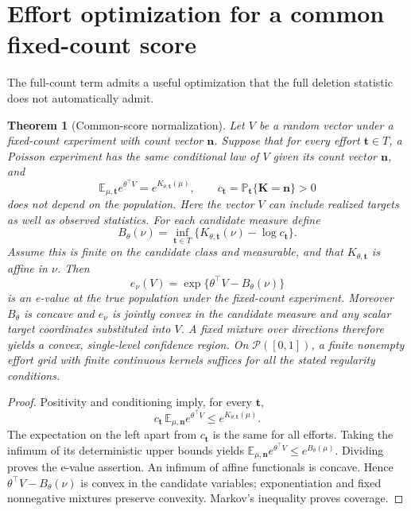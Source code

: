 \documentclass[11pt]{article}
\newtheorem{theorem}{Theorem}[section]
\theoremstyle{remark}\newtheorem{remark}[theorem]{Remark}
\newcommand{\E}{\mathbb E}\newcommand{\PP}{\mathbb P}
\begin{document}
\section{Effort optimization for a common fixed-count score}
The full-count term admits a useful optimization that the full deletion
statistic does not automatically admit.

\begin{theorem}[Common-score normalization]\label{thm:common}
Let $V$ be a random vector under a fixed-count experiment with count
vector $\boldsymbol n$. Suppose that for every effort
$\boldsymbol t\in T$, a Poisson experiment has the same conditional law
of $V$ given its count vector $\boldsymbol n$, and
\[
 \E_{\mu,\boldsymbol t}e^{\theta^\top V}
       =e^{K_{\theta,\boldsymbol t}(\mu)},\qquad
 c_{\boldsymbol t}=\PP_{\boldsymbol t}\{
                 \boldsymbol K=\boldsymbol n\}>0
\]
does not depend on the population. Here the vector $V$ can include
realized targets as well as observed statistics.
For each candidate measure define
\[
 B_\theta(\nu)=\inf_{\boldsymbol t\in T}
       \{K_{\theta,\boldsymbol t}(\nu)-\log c_{\boldsymbol t}\}.
\]
Assume this is finite on the candidate class and measurable, and that
$K_{\theta,\boldsymbol t}$ is affine in $\nu$. Then
\[
 e_\nu(V)=\exp\{\theta^\top V-B_\theta(\nu)\}
\]
is an e-value at the true population under the fixed-count experiment.
Moreover $B_\theta$ is concave and $e_\nu$ is jointly convex in the
candidate measure and any scalar target coordinates substituted into $V$.
A fixed mixture over directions therefore yields a convex,
single-level confidence region.
On $\mathcal P([0,1])$, a finite nonempty effort grid with finite continuous
kernels suffices for all the stated regularity conditions.
\end{theorem}
\begin{proof}
Positivity and conditioning imply, for every $\boldsymbol t$,
\[
 c_{\boldsymbol t}\,
 \E_{\mu,\boldsymbol n}e^{\theta^\top V}
 \le e^{K_{\theta,\boldsymbol t}(\mu)}.
\]
The expectation on the left apart from $c_{\boldsymbol t}$ is the same
for all efforts. Taking the infimum of its deterministic upper bounds yields
$\E_{\mu,\boldsymbol n}e^{\theta^\top V}\le e^{B_\theta(\mu)}$.
Dividing proves the e-value assertion. An infimum of affine functionals is
concave. Hence $\theta^\top V-B_\theta(\nu)$ is convex in the candidate
variables; exponentiation and fixed nonnegative mixtures preserve convexity.
Markov's inequality proves coverage.
\end{proof}
\end{document}
